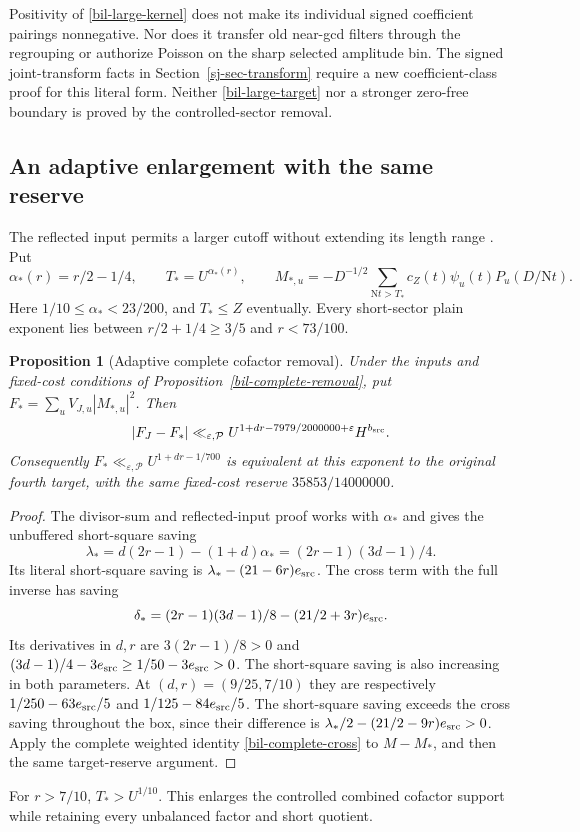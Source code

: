 \documentclass[11pt]{article}
\newtheorem{proposition}[theorem]{Proposition}
\theoremstyle{definition}
\newcommand{\N}{\mathrm N}
\newcommand{\eps}{\varepsilon}
\newcommand{\lls}{\ll_{\eps,\mathcal P}}
\begin{document}
Positivity of \eqref{bil-large-kernel} does not make its individual
signed coefficient pairings nonnegative.  Nor does it transfer old
near-gcd filters through the regrouping or authorize Poisson on the
sharp selected amplitude bin.  The signed joint-transform facts in
Section~\ref{sj-sec-transform} require a new coefficient-class proof
for this literal form.
Neither \eqref{bil-large-target} nor a stronger zero-free boundary is
proved by the controlled-sector removal.

\subsection{An adaptive enlargement with the same reserve}
\label{bil-adaptive-sector}
The reflected input permits a larger cutoff without extending its length
range \cite{n24}. Put
\begin{equation}\label{bil-adaptive-cut}
 \alpha_*(r)=r/2-1/4,\qquad T_*=U^{\alpha_*(r)},\qquad
 M_{*,u}=-D^{-1/2}\sum_{\N t>T_*}c_Z(t)\psi_u(t)P_u(D/\N t).
\end{equation}
Here $1/10\le\alpha_*<23/200$, and $T_*\le Z$ eventually. Every
short-sector plain exponent lies between $r/2+1/4\ge3/5$ and $r<73/100$.

\begin{proposition}[Adaptive complete cofactor removal]
\label{bil-adaptive-removal}
Under the inputs and fixed-cost conditions of
Proposition~\ref{bil-complete-removal}, put
$F_* =\sum_uV_{J,u}|M_{*,u}|^2$. Then
\begin{equation}\label{bil-adaptive-difference}
 |F_J-F_*|\ll_{\eps,\mathcal P}
 U^{1+dr-7979/2000000+\eps}H^{b_{\rm src}}.
\end{equation}
Consequently $F_*\lls U^{1+dr-1/700}$ is equivalent at this exponent
to the original fourth target, with the same fixed-cost reserve
$35853/14000000$.
\end{proposition}
\begin{proof}
The divisor-sum and reflected-input proof works with $\alpha_*$ and gives
the unbuffered short-square saving
\[
 \lambda_*=d(2r-1)-(1+d)\alpha_*
           =(2r-1)(3d-1)/4.
\]
Its literal short-square saving is $\lambda_*-(21-6r)e_{\rm src}$.
The cross term with the full inverse has saving
\[
 \delta_*=(2r-1)(3d-1)/8-(21/2+3r)e_{\rm src}.
\]
Its derivatives in $d,r$ are $3(2r-1)/8>0$ and
$(3d-1)/4-3e_{\rm src}\ge1/50-3e_{\rm src}>0$.
The short-square saving is also increasing in both parameters. At
$(d,r)=(9/25,7/10)$ they are respectively
$1/250-63e_{\rm src}/5$ and $1/125-84e_{\rm src}/5$.
The short-square saving exceeds the cross saving throughout the box,
since their difference is $\lambda_*/2-(21/2-9r)e_{\rm src}>0$.
Apply the complete weighted identity \eqref{bil-complete-cross} to
$M-M_*$, and then the same target-reserve argument.
\end{proof}
For $r>7/10$, $T_*>U^{1/10}$. This enlarges the controlled combined
cofactor support while retaining every unbalanced factor and short quotient.
\end{document}
